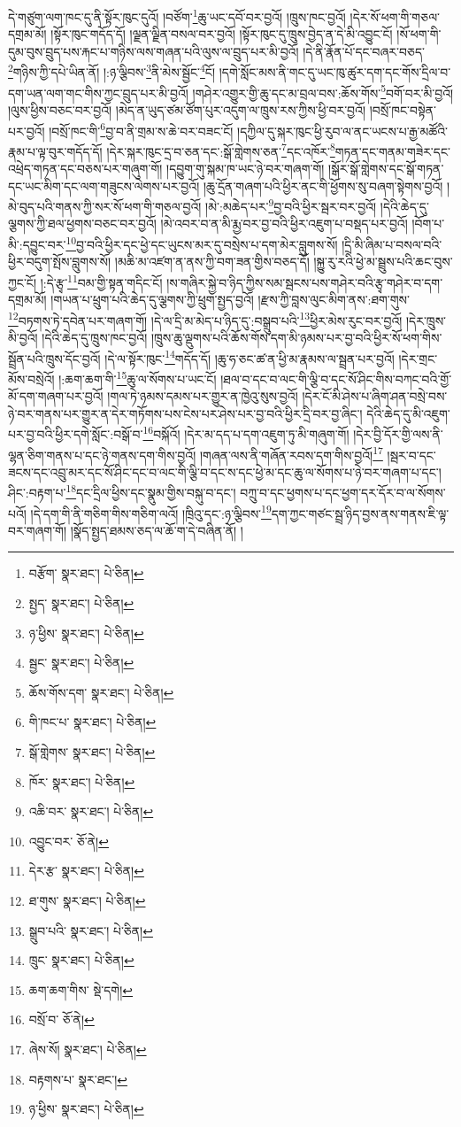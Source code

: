 དེ་གཙུག་ལག་ཁང་དུ་ནི་སྟོར་ཁུང་དུའོ། །བཙོག་\footnote{བརྩོག་  སྣར་ཐང་།  པེ་ཅིན། }ཆུ་ཡང་དབོ་བར་བྱའོ། །ཁྲུས་ཁང་བྱའོ། །དེར་སོ་ཕག་གི་གཅལ་དགྲམ་མོ། །སྟོར་ཁུང་གདོད་དོ། །ལྗན་ལྗིན་བསལ་བར་བྱའོ། །སྟོར་ཁུང་དུ་ཁྲུས་བྱེད་ན་དེ་མི་འབྱུང་ངོ། །སོ་ཕག་གི་དུམ་བུས་བྲུད་པས་རྐང་པ་གཉིས་ལས་གཞན་པའི་ལུས་ལ་བྲུད་པར་མི་བྱའོ། །དེ་ནི་རྣོན་པོ་དང་བཞར་བཅད་\footnote{སྤྱད་  སྣར་ཐང་།  པེ་ཅིན། }གཉིས་ཀྱི་དཔེ་ཡིན་ནོ། །:ཉ་ལྕིབས་\footnote{ཉ་ཕྱིས་  སྣར་ཐང་།  པེ་ཅིན། }ནི་མེས་སྦྱོང་\footnote{སྦྱང་  སྣར་ཐང་།  པེ་ཅིན། }ངོ། །དགེ་སློང་མས་ནི་གང་དུ་ཡང་ཁུ་ཚུར་དག་དང་གོས་དྲིལ་བ་དག་ཡན་ལག་གང་གིས་ཀྱང་བྲུད་པར་མི་བྱའོ། །གཤེར་འགྱུར་གྱི་ཆུ་དང་མ་བྲལ་བས་:ཆོས་གོས་\footnote{ཆོས་གོས་དག་  སྣར་ཐང་།  པེ་ཅིན། }བགོ་བར་མི་བྱའོ། །ལུས་ཕྱིས་བཅང་བར་བྱའོ། །མེད་ན་ཡུད་ཙམ་ཙོག་པུར་འདུག་ལ་ཁྲུས་རས་ཀྱིས་ཕྱི་བར་བྱའོ། །བསྲོ་ཁང་བསྟེན་པར་བྱའོ། །བསྲོ་ཁང་གི་\footnote{གི་ཁང་པ་  སྣར་ཐང་།  པེ་ཅིན། }བྱ་བ་ནི་གྲམ་ས་ཆེ་བར་བཟང་ངོ། །དཀྱིལ་དུ་སྐར་ཁུང་ཕྱི་རུབ་ལ་ནང་ཡངས་པ་རྒྱ་མཚོའི་རྣམ་པ་ལྟ་བུར་གདོད་དོ། །དེར་སྐར་ཁུང་དྲ་བ་ཅན་དང་:སྒོ་གླེགས་ཅན་\footnote{སྒོ་གླེགས་  སྣར་ཐང་།  པེ་ཅིན། }དང་འཁོར་\footnote{ཁོར་  སྣར་ཐང་།  པེ་ཅིན། }གཏན་དང་གནམ་གཟེར་དང་འཕྲེད་གཏན་དང་བཅས་པར་གཞུག་གོ། །དབྱུག་གུ་སྐམ་ཁ་ཡང་ཉེ་བར་གཞག་གོ། །སྒོར་སྒོ་གླེགས་དང་སྒོ་གཏན་དང་ཡང་མིག་དང་ལག་གཟུངས་ལེགས་པར་བྱའོ། །ཆུ་དྲོན་གཞག་པའི་ཕྱིར་ནང་གི་ཕྱོགས་སུ་བཞག་སྟེགས་བྱའོ། །མེ་བུད་པའི་གནས་ཀྱི་སར་སོ་ཕག་གི་གཅལ་བྱའོ། །མེ་:མཆེད་པར་\footnote{འཆི་བར་  སྣར་ཐང་།  པེ་ཅིན། }བྱ་བའི་ཕྱིར་སྦར་བར་བྱའོ། །དེའི་ཆེད་དུ་ལྕགས་ཀྱི་ཐལ་ཕྱགས་བཅང་བར་བྱའོ། །མེ་འབར་བ་ན་མི་རྨྱ་བར་བྱ་བའི་ཕྱིར་འཇུག་པ་བསྡད་པར་བྱའོ། །བོག་པ་མི་:དབྱུང་བར་\footnote{འབྱུང་བར་  ཅོ་ནེ། }བྱ་བའི་ཕྱིར་དང་ཕྱེ་དང་ཡུངས་མར་དུ་བསྲེས་པ་དག་མེར་བླུགས་སོ། །དྲི་མི་ཞིམ་པ་བསལ་བའི་ཕྱིར་བདུག་སྤོས་བླུགས་སོ། །མཆི་མ་འཛག་ན་ནས་ཀྱི་བག་ཟན་གྱིས་བཅད་དོ། །སྐྱུ་རུ་རའི་ཕྱེ་མ་སྦྲུས་པའི་ཆང་བུས་ཀྱང་ངོ། །:དེ་རྩྭ་\footnote{དེར་རྩ་  སྣར་ཐང་།  པེ་ཅིན། }བམ་གྱི་སྟན་གདིང་ངོ། །ས་གཞིར་སྐྱེ་བ་ཉིད་ཀྱིས་སམ་སྦངས་པས་གཤེར་བའི་རྩྭ་གཤེར་བ་དག་དགྲམ་མོ། །གཡན་པ་ཕྲུག་པའི་ཆེད་དུ་ལྕགས་ཀྱི་ཕྲུག་སྤྱད་བྱའོ། །རྫས་ཀྱི་བླས་ལུང་མིག་ནས་:ཐག་གུས་\footnote{ཐ་གུས་  སྣར་ཐང་།  པེ་ཅིན། }བཏགས་ཏེ་དབེན་པར་གཞག་གོ། །དེ་ལ་དྲི་མ་མེད་པ་ཉིད་དུ་:བསྒྲུབ་པའི་\footnote{སྒྲུབ་པའི་  སྣར་ཐང་།  པེ་ཅིན། }ཕྱིར་མེས་རུང་བར་བྱའོ། །དེར་ཁྲུས་མི་བྱའོ། །དེའི་ཆེད་དུ་ཁྲུས་ཁང་བྱའོ། །ཁྲུས་ཆུ་ལྡུགས་པའི་ཆོས་གོས་དག་མི་ཉམས་པར་བྱ་བའི་ཕྱིར་སོ་ཕག་གིས་སྦྲོན་པའི་ཁྲུས་དོང་བྱའོ། །དེ་ལ་སྟོར་ཁུང་\footnote{ཁྲུང་  སྣར་ཐང་།  པེ་ཅིན། }གདོད་དོ། །ཆུ་ཧ་ཅང་ཚ་ན་ཕྱི་མ་རྣམས་ལ་སྦྲན་པར་བྱའོ། །དེར་གྲང་མོས་བསྲེའོ། །:ཆག་ཆག་གི་\footnote{ཆག་ཆག་གིས་  སྡེ་དགེ། }ཆུ་ལ་སོགས་པ་ཡང་ངོ། །ཐལ་བ་དང་བ་ལང་གི་ལྕི་བ་དང་སོ་ཤིང་གིས་བཀང་བའི་གྱོ་མོ་དག་གཞག་པར་བྱའོ། །གལ་ཏེ་ཉམས་དམས་པར་གྱུར་ན་ཁྱེའུ་སུས་བྱའོ། །དེར་ངོ་མི་ཤེས་པ་ཞིག་ཤན་བསྲེ་བས་ཉེ་བར་གནས་པར་གྱུར་ན་དེར་གཏོགས་པས་ངེས་པར་ཤེས་པར་བྱ་བའི་ཕྱིར་དྲི་བར་བྱ་ཞིང་། དེའི་ཆེད་དུ་མི་འཇུག་པར་བྱ་བའི་ཕྱིར་དགེ་སློང་:བསྒོ་བ་\footnote{བསྲོ་བ་  ཅོ་ནེ། }བསྐོའོ། །དེར་མ་དད་པ་དག་འཇུག་ཏུ་མི་གཞུག་གོ། །དེར་བྱི་དོར་གྱི་ལས་ནི་ལྷན་ཅིག་གནས་པ་དང་ཉེ་གནས་དག་གིས་བྱའོ། །གཞན་ལས་ནི་གཞོན་རབས་དག་གིས་བྱའོ།\footnote{ཞེས་སོ།  སྣར་ཐང་།  པེ་ཅིན། } །སྦར་བ་དང་ཟངས་དང་འབྲུ་མར་དང་སོ་ཤིང་དང་བ་ལང་གི་ལྕི་བ་དང་ས་དང་ཕྱེ་མ་དང་ཆུ་ལ་སོགས་པ་ཉེ་བར་གཞག་པ་དང་། ཤིང་:བརྟག་པ་\footnote{བརྟགས་པ་  སྣར་ཐང་། }དང་དྲིལ་ཕྱིས་དང་སྣུམ་གྱིས་བསྐུ་བ་དང་། བཀྲུ་བ་དང་ཕྱགས་པ་དང་ཕྱག་དར་དོར་བ་ལ་སོགས་པའོ། །དེ་དག་གི་ནི་གཅིག་གིས་གཅིག་ལའོ། །ཁྲིའུ་དང་:ཉ་ལྕིབས་\footnote{ཉ་ཕྱིས་  སྣར་ཐང་།  པེ་ཅིན། }དག་ཀྱང་གཙང་སྦྲ་ཉིད་བྱས་ནས་གནས་ཇི་ལྟ་བར་གཞག་གོ། །སྣོད་སྤྱད་ཐམས་ཅད་ལ་ཆོ་ག་དེ་བཞིན་ནོ། །
